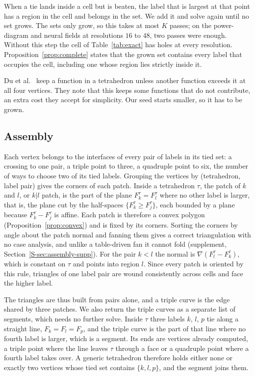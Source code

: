 \documentclass{egpubl}
\newcommand{\sref}[1]{\ref*{S-#1}}
\newcommand{\suppp}[1]{supplement, Section~\sref{#1}}
\theoremstyle{definition}
\newcommand{\tet}{\tau}
\newcommand{\interp}{F}
\begin{document}
When a tie lands inside a cell but is beaten, the label that is largest at
that point has a region in the cell and belongs in the set. We add it and
solve again until no set grows. The sets only grow, so this takes at most
$K$ passes; on the power-diagram and neural fields at resolutions $16$ to
$48$, two passes were enough. Without this step the cell of
Table~\ref{tab:exact} has holes at every resolution.
Proposition~\ref{prop:complete} states that the grown set contains every
label that occupies the cell, including one whose region lies strictly
inside it.

Du et al.~\cite{du2022} keep a function in a tetrahedron unless another
function exceeds it at all four vertices. They note that this keeps some
functions that do not contribute, an extra cost they accept for
simplicity. Our seed starts smaller, so it has to be grown.

\subsection{Assembly}
\label{sec:assembly}

Each vertex belongs to the interfaces of every pair of labels in its tied set:
a crossing to one pair, a triple point to three, a quadruple point to six,
the number of ways to choose two of its tied labels.
Grouping the vertices by (tetrahedron, label pair) gives the corners of each
patch. Inside a tetrahedron $\tet$, the patch of $k$ and $l$, or $k|l$ patch, is the part of
the plane $\interp^\tet_k = \interp^\tet_l$ where no other label is larger,
that is, the plane cut by the half-spaces
$\{\interp^\tet_k \ge \interp^\tet_j\}$, each bounded by a plane because
$\interp^\tet_k - \interp^\tet_j$ is affine. Each patch is therefore a convex
polygon (Proposition~\ref{prop:convex}) and is fixed by its corners. Sorting the
corners by angle about the patch normal and fanning them gives a
correct triangulation with no case analysis, and unlike a table-driven fan it
cannot fold (\suppp{sec:assembly-supp}). For the pair $k < l$ the normal is
$\nabla(\interp^\tet_l - \interp^\tet_k)$, which is constant on $\tet$ and
points into region $l$. Since every patch is oriented by this rule, triangles
of one label pair are wound consistently across cells and face the higher label.

The triangles are thus built from pairs alone, and a triple curve is the
edge shared by three patches. We also return the triple curves as a separate
list of segments, which needs no further solve. Inside $\tet$ three labels $k$, $l$,
$p$ tie along a straight line, $\interp_k = \interp_l = \interp_p$, and the
triple curve is the part of that line where no fourth label is larger, which
is a segment. Its ends are vertices already computed, a triple point where the
line leaves $\tet$ through a face or a quadruple point where a fourth label
takes over. A generic tetrahedron therefore holds either none or exactly two
vertices whose tied set contains $\{k,l,p\}$, and the segment joins them.
\end{document}

